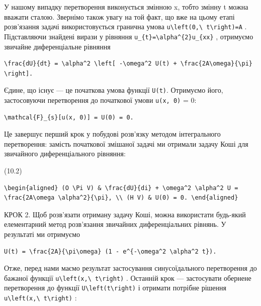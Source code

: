 \documentclass[
  ukrainian,
]{article}
\begin{document}
У нашому випадку перетворення виконується змінною x, тобто змінну t
можна вважати сталою. Звернімо також увагу на той факт, що вже на цьому
етапі розв'язання задачі використовується гранична умова
\texttt{u\textbackslash{}left(0,\textbackslash{}\ t\textbackslash{}right)=A}
. Підставляючи знайдені вирази у рівняння
\texttt{u\_\{t\}=\textbackslash{}alpha\^{}\{2\}u\_\{xx\}} , отримуємо
звичайне диференціальне рівняння

\begin{verbatim}
\frac{dU}{dt} = \alpha^2 \left[ -\omega^2 U(t) + \frac{2A\omega}{\pi} \right].
\end{verbatim}

Єдине, що існує --- це початкова умова функції \texttt{U(t)}. Отримуємо
його, застосовуючи перетворення до початкової умови \texttt{u(x,\ 0)} =
0:

\begin{verbatim}
\mathcal{F}_{s}[u(x, 0)] = U(0) = 0.
\end{verbatim}

Це завершує перший крок у побудові розв'язку методом інтегрального
перетворення: замість початкової змішаної задачі ми отримали задачу Коші
для звичайного диференціального рівняння:

(10.2)

\begin{verbatim}
\begin{aligned} (O \Pi V) & \frac{dU}{di} + \omega^2 \alpha^2 U = \frac{2A\omega \alpha^2}{\pi}, \\ (H V) & U(0) = 0. \end{aligned}
\end{verbatim}

КРОК 2. Щоб розв'язати отриману задачу Коші, можна використати будь-який
елементарний метод розв'язання звичайних диференціальних рівнянь. У
результаті ми отримуємо

\begin{verbatim}
U(t) = \frac{2A}{\pi\omega} (1 - e^{-\omega^2 \alpha^2 t}).
\end{verbatim}

Отже, перед нами маємо результат застосування синусоїдального
перетворення до бажаної функції
\texttt{u\textbackslash{}left(x,\textbackslash{}\ t\textbackslash{}right)}
. Останній крок --- застосувати обернене перетворення до функції
\texttt{U\textbackslash{}left(t\textbackslash{}right)} і отримати
потрібне рішення
\texttt{u\textbackslash{}left(x,\textbackslash{}\ t\textbackslash{}right)}
:
\end{document}
